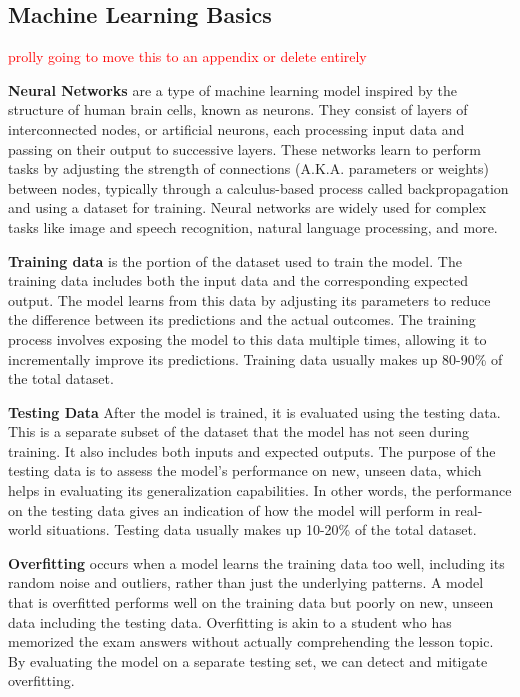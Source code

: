 \documentclass{article}
\begin{document}
\subsection{Machine Learning Basics}
\label{subsec:intro-ML}

\textcolor{red}{prolly going to move this to an appendix or delete entirely}

\textbf{Neural Networks} are a type of machine learning model inspired by the structure of human brain cells, known as neurons. 
They consist of layers of interconnected nodes, or artificial neurons, each processing input data and passing on their output to successive layers. 
These networks learn to perform tasks by adjusting the strength of connections (A.K.A. parameters or weights) between nodes, typically through a calculus-based process called backpropagation and using a dataset for training. 
Neural networks are widely used for complex tasks like image and speech recognition, natural language processing, and more.

\textbf{Training data} is the portion of the dataset used to train the model. 
The training data includes both the input data and the corresponding expected output. 
The model learns from this data by adjusting its parameters to reduce the difference between its predictions and the actual outcomes. 
The training process involves exposing the model to this data multiple times, allowing it to incrementally improve its predictions. 
Training data usually makes up 80-90\% of the total dataset.\par

\textbf{Testing Data} After the model is trained, it is evaluated using the testing data. 
This is a separate subset of the dataset that the model has not seen during training. 
It also includes both inputs and expected outputs. 
The purpose of the testing data is to assess the model's performance on new, unseen data, which helps in evaluating its generalization capabilities. 
In other words, the performance on the testing data gives an indication of how the model will perform in real-world situations. 
Testing data usually makes up 10-20\% of the total dataset.\par

\textbf{Overfitting} occurs when a model learns the training data too well, including its random noise and outliers, rather than just the underlying patterns. 
A model that is overfitted performs well on the training data but poorly on new, unseen data including the testing data. 
Overfitting is akin to a student who has memorized the exam answers without actually comprehending the lesson topic. 
By evaluating the model on a separate testing set, we can detect and mitigate overfitting.
\end{document}
